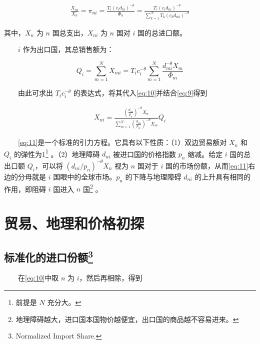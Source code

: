 \documentclass[
]{article}
\begin{document}
\begin{align}
\frac{X_{n i}}{X_{n}}=\pi_{ni}=\frac{T_{i}\left(c_{i} d_{n i}\right)^{-\theta}}{\Phi_{n}}=\frac{T_{i}\left(c_{i} d_{n i}\right)^{-\theta}}{\sum_{k=1}^{N} T_{k}\left(c_{k} d_{n k}\right)^{-\theta}} \label{eq:10}
\end{align}

其中，\(X_{n}\) 为 \(n\) 国总支出，\(X_{n i}\) 为 \(n\) 国对 \(i\) 国的总进口额。

　　\(i\) 作为出口国，其总销售额为：

\[
Q_{i}=\sum_{m=1}^{N} X_{m i}=T_{i} c_{i}^{-\theta} \sum_{m=1}^{N} \frac{d_{m i}^{-\theta} X_{m}}{\Phi_{m}}
\]

　　由此可求出 \(T_{i} c_{i}^{-\theta}\) 的表达式，将其代入\eqref{eq:10}并结合\eqref{eq:9}得到

\begin{align}
X_{n i}=\frac{\left(\frac{d_{n i}}{p_{n}}\right)^{-\theta} X_{n}}{\sum_{m=1}^{N}\left(\frac{d_{m i}}{p_{m}}\right)^{-\theta} X_{m}} Q_{i} \label{eq:11}
\end{align}

　　\eqref{eq:11}是一个标准的{引力方程}。它具有以下性质：（1）双边贸易额对 \(X_n\) 和 \(Q_i\) 的弹性为1\footnote{前提是 \(N\) 充分大。} 。（2）地理障碍 \(d_{ni}\) 被进口国的价格指数 \(p_n\) 缩减。给定 \(i\) 国的总出口额 \(Q_i\)，可以将 \({\left({d_{n i}}/{p_{n}}\right)^{-\theta} X_{n}}\) 视为 \(n\) 国对于 \(i\) 国的市场份额，从而\eqref{eq:11}右边的分母就是 \(i\) 国眼中的全球市场。\(p_n\) 的下降与地理障碍 \(d_{ni}\) 的上升具有相同的作用，即阻碍 \(i\) 国进入 \(n\) 国\footnote{地理障碍越大，进口国本国物价越便宜，出口国的商品越不容易进来。} 。

\hypertarget{ux8d38ux6613ux5730ux7406ux548cux4ef7ux683cux521dux63a2}{%
\section{贸易、地理和价格初探}\label{ux8d38ux6613ux5730ux7406ux548cux4ef7ux683cux521dux63a2}}

\hypertarget{ux6807ux51c6ux5316ux7684ux8fdbux53e3ux4efdux989d}{%
\subsection[标准化的进口份额]{\texorpdfstring{标准化的进口份额\footnote{Normalized Import Share.}}{标准化的进口份额}}\label{ux6807ux51c6ux5316ux7684ux8fdbux53e3ux4efdux989d}}

　　在\eqref{eq:10}中取 \(n\) 为 \(i\)，然后再相除，得到
\end{document}
